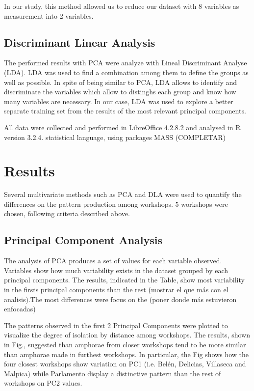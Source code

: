 \documentclass[review, twocolumn]{elsarticle}
\begin{document}
In our study, this method allowed us to reduce our dataset with 8 variables as measurement into 2 variables. 

\subsection{Discriminant Linear Analysis} 


The performed results with PCA were analyze with Lineal Discriminant Analyse (LDA). LDA was used to find a combination among them to define the groups as well as possible. In spite of being similar to PCA, LDA allows to identify and discriminate the variables which allow to distinghs each group and know how many variables are necessary. In our case, LDA was used to explore a better separate training set from the results of the most relevant principal components. 

All data were collected and performed in LibreOffice 4.2.8.2 and analysed in R version 3.2.4. statistical language, using packages MASS (COMPLETAR)


\section{Results}

Several multivariate methods such as PCA and DLA were used to quantify the differences on the pattern production among workshops. 5 workshops were chosen, following criteria described above. 

\subsection{Principal Component Analysis}

The analysis of PCA produces a set of values for each variable observed. Variables show how much variability exists in the dataset grouped by each principal components. The results, indicated in the Table, show most variability in the firsts principal components than the rest (mostrar el que más con el analisis).The most differences were focus on the (poner donde más estuvieron enfocadas)

The patterns observed in the first 2 Principal Components were plotted to visualize the degree of isolation by distance among workshops. The results, shown in Fig., suggested than amphorae from closer workshops tend to be more similar than amphorae made in furthest workshops. In particular, the Fig shows how the four closest workshops show variation on PC1 (i.e. Belén, Delicias, Villaseca and Malpica) while Parlamento display a distinctive pattern than the rest of workshops on PC2 values. 
\end{document}
